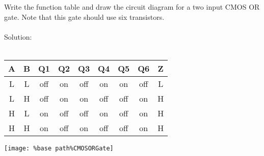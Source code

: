 Write the function table and draw the circuit diagram for a two input CMOS OR gate.  Note that this gate should use six transistors.\\ \\

Solution: \\ \\
\begin{tabular}{ccccccccc}
  \textbf{A} & \textbf{B} & \textbf{Q1} & \textbf{Q2} & \textbf{Q3} & \textbf{Q4} & \textbf{Q5} & \textbf{Q6} & \textbf{Z} \\
  \hline
  L & L & off & on & off & on & on & off & L\\
  L & H & off & on & on & off & off & on & H\\
  H & L & on & off & off & on & off & on & H\\
  H & H & on & off & on & off & off & on & H\\
\end{tabular}
\medskip
\texttt{[image: \%base path\%CMOSORGate]}
